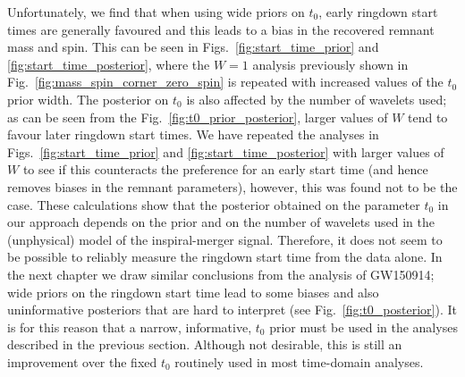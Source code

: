 Unfortunately, we find that when using wide priors on $t_0$, early ringdown start times are generally favoured and this leads to a bias in the recovered remnant mass and spin.
This can be seen in Figs.~\ref{fig:start_time_prior} and \ref{fig:start_time_posterior}, where the $W=1$ analysis previously shown in Fig.~\ref{fig:mass_spin_corner_zero_spin} is repeated with increased values of the $t_0$ prior width.
The posterior on $t_0$ is also affected by the number of wavelets used; as can be seen from the Fig.~\ref{fig:t0_prior_posterior}, larger values of $W$ tend to favour later ringdown start times. 
We have repeated the analyses in Figs.~\ref{fig:start_time_prior} and \ref{fig:start_time_posterior} with larger values of $W$ to see if this counteracts the preference for an early start time (and hence removes biases in the remnant parameters), however, this was found not to be the case.
These calculations show that the posterior obtained on the parameter $t_0$ in our approach depends on the prior and on the number of wavelets used in the (unphysical) model of the inspiral-merger signal.
Therefore, it does not seem to be possible to reliably measure the ringdown start time from the data alone.
In the next chapter we draw similar conclusions from the analysis of GW150914; wide priors on the ringdown start time lead to some biases and also uninformative posteriors that are hard to interpret (see Fig.~\ref{fig:t0_posterior}).
It is for this reason that a narrow, informative, $t_0$ prior must be used in the analyses described in the previous section.
Although not desirable, this is still an improvement over the fixed $t_0$ routinely used in most time-domain analyses.

